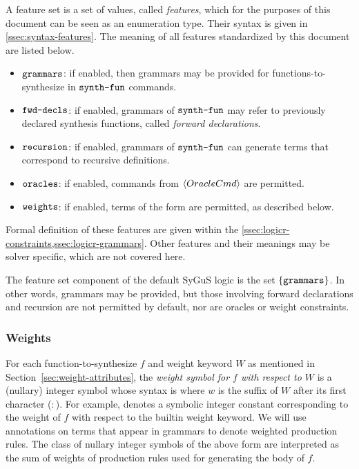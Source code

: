 \documentclass[english,a4paper,10pt]{article}
\begin{document}
A feature set is a set of values, called \emph{features},
which for the purposes of this document can be seen as an enumeration type.
Their syntax is given in \cref{ssec:syntax-features}.
The meaning of all features standardized by this document are listed below.
\begin{itemize}
\item $\texttt{grammars}$: if enabled, 
then grammars may be provided for functions-to-synthesize 
in $\texttt{synth-fun}$ commands.
\item $\texttt{fwd-decls}$: if enabled,
grammars of $\texttt{synth-fun}$ may refer to previously declared synthesis functions,
called \emph{forward declarations}.
\item $\texttt{recursion}$: if enabled,
grammars of $\texttt{synth-fun}$ can generate terms that correspond to recursive definitions.
\item $\texttt{oracles}$: if enabled,
commands from $\left\langle OracleCmd\right\rangle$ are permitted.
\item $\texttt{weights}$: if enabled,
terms of the form  are permitted,
as described below.
\end{itemize}
Formal definition of these features are given within the 
\cref{ssec:logicr-constraints,ssec:logicr-grammars}.
Other features and their meanings may be solver specific, 
which are not covered here.

The feature set component of the default SyGuS logic is the set $\{ \texttt{grammars} \}$.
In other words, grammars may be provided, but those involving
forward declarations and recursion are not permitted by default,
nor are oracles or weight constraints.

\subsubsection{Weights}
\label{sec:weight-semantics}
For each function-to-synthesize $f$ and weight keyword $W$
as mentioned in Section~\ref{sec:weight-attributes},
the \emph{weight symbol for $f$ with respect to $W$} is a (nullary) integer symbol
whose syntax is  where $w$ is the
suffix of $W$ after its first character ($:$).
For example, 
denotes a symbolic integer constant corresponding to the weight of $f$
with respect to the builtin weight keyword.
We will use annotations on terms that appear in grammars
to denote weighted production rules.
The class of nullary integer symbols of the above form are
interpreted as the sum of weights of production rules used for generating the body of $f$.
\end{document}

